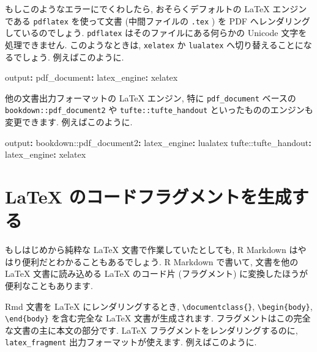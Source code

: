 \documentclass[
  11pt,
  lualatex,ja=standard,jafont=noto]{bxjsreport}
\newenvironment{Shaded}{\begin{snugshade}}{\end{snugshade}}
\newcommand{\AttributeTok}[1]{\textcolor[rgb]{0.77,0.63,0.00}{#1}}
\newcommand{\FunctionTok}[1]{\textcolor[rgb]{0.00,0.00,0.00}{#1}}
\newcommand{\KeywordTok}[1]{\textcolor[rgb]{0.13,0.29,0.53}{\textbf{#1}}}
\begin{document}
もしこのようなエラーにでくわしたら, おそらくデフォルトの LaTeX エンジンである \texttt{pdflatex} を使って文書 (中間ファイルの \texttt{.tex} ) を PDF へレンダリングしているのでしょう. \texttt{pdflatex} はそのファイルにある何らかの Unicode 文字を処理できません. このようなときは, \texttt{xelatex} か \texttt{lualatex} へ切り替えることになるでしょう. 例えばこのように.

\begin{Shaded}
\begin{Highlighting}[]
\FunctionTok{output}\KeywordTok{:}
\AttributeTok{  }\FunctionTok{pdf\_document}\KeywordTok{:}
\AttributeTok{    }\FunctionTok{latex\_engine}\KeywordTok{:}\AttributeTok{ xelatex}
\end{Highlighting}
\end{Shaded}

他の文書出力フォーマットの LaTeX エンジン, 特に \texttt{pdf\_document} ベースの \texttt{bookdown::pdf\_document2} や \texttt{tufte::tufte\_handout} といったもののエンジンも変更できます. 例えばこのように.

\begin{Shaded}
\begin{Highlighting}[]
\FunctionTok{output}\KeywordTok{:}
\AttributeTok{  bookdown::pdf\_document2}\KeywordTok{:}\FunctionTok{}
\AttributeTok{    }\FunctionTok{latex\_engine}\KeywordTok{:}\AttributeTok{ lualatex}
\AttributeTok{  tufte::tufte\_handout}\KeywordTok{:}\FunctionTok{}
\AttributeTok{    }\FunctionTok{latex\_engine}\KeywordTok{:}\AttributeTok{ xelatex}
\end{Highlighting}
\end{Shaded}

\hypertarget{latex-fragment}{%
\section{LaTeX のコードフラグメントを生成する}\label{latex-fragment}}

もしはじめから純粋な LaTeX 文書で作業していたとしても, R Markdown はやはり便利だとわかることもあるでしょう. R Markdown で書いて, 文書を他の LaTeX 文書に読み込める LaTeX のコード片 (フラグメント) に変換したほうが便利なこともあります.

Rmd 文書を LaTeX にレンダリングするとき, \texttt{\textbackslash{}documentclass\{\}}, \texttt{\textbackslash{}begin\{body\}}, \texttt{\textbackslash{}end\{body\}} を含む完全な LaTeX 文書が生成されます. フラグメントはこの完全な文書の主に本文の部分です. LaTeX フラグメントをレンダリングするのに, \texttt{latex\_fragment} 出力フォーマットが使えます. 例えばこのように.
\end{document}
